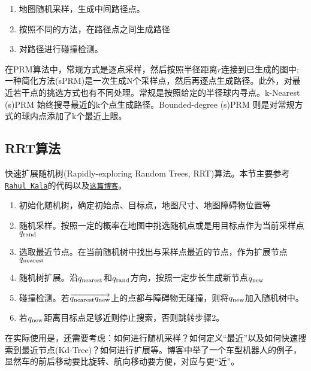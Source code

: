 
\begin{enumerate}
\item 地图随机采样，生成中间路径点。
\item 按照不同的方法，在路径点之间生成路径
\item 对路径进行碰撞检测。
\end{enumerate}

在PRM算法中，常规方式是逐点采样，然后按照半径距离$r$连接到已生成的图中;一种简化方法(sPRM)是一次生成N个采样点，然后再逐点生成路径。此外，对最近若干点的挑选方式也有不同处理。常规是按照给定的半径球内寻点。k-Nearest (s)PRM 始终搜寻最近的k个点生成路径。Bounded-degree (s)PRM 则是对常规方式的球内点添加了k个最近上限。


\subsection{RRT算法}
快速扩展随机树(Rapidly-exploring Random Trees, RRT)算法。本节主要参考\href{http://rkala.in/codes/RRT.zip}{\texttt{Rahul Kala}}的代码以及\href{http://www.cnblogs.com/21207-iHome/p/7210543.html}{\texttt{这篇博客}}。


\begin{enumerate}
\item 初始化随机树，确定初始点、目标点，地图尺寸、地图障碍物位置等
\item 随机采样。按照一定的概率在地图中挑选随机点或是用目标点作为当前采样点$q_\rm{rand}$
\item 选取最近节点。在当前随机树中找出与采样点最近的节点，作为扩展节点$q_\rm{nearest}$
\item 随机树扩展。沿$q_\rm{nearest}$和$q_\rm{rand}$方向，按照一定步长生成新节点$q_\rm{new}$
\item 碰撞检测。若$\overrightarrow{q_\rm{nearest} q_\rm{new}}$上的点都与障碍物无碰撞，则将$q_\rm{new}$加入随机树中。
\item 若$q_\rm{new}$距离目标点足够近则停止搜索，否则跳转步骤2。
\end{enumerate}

在实际使用是，还需要考虑：如何进行随机采样？如何定义“最近”以及如何快速搜索到最近节点(Kd-Tree)？如何进行扩展等。博客中举了一个车型机器人的例子，显然车的前后移动要比旋转、航向移动要方便，对应与更“近”。


